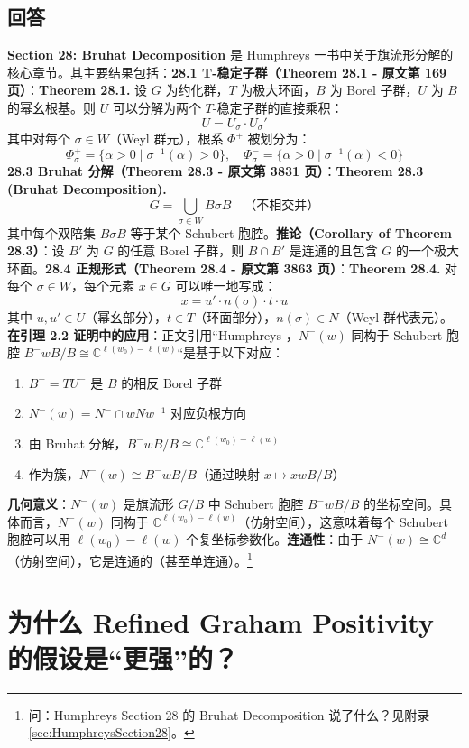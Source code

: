 \subsection{回答}
\textbf{Section 28: Bruhat Decomposition} 是 Humphreys 一书中关于旗流形分解的核心章节。其主要结果包括：\bigskip\textbf{28.1 T-稳定子群（Theorem 28.1 - 原文第 169 页）}：\textbf{Theorem 28.1.} 设 $G$ 为约化群，$T$ 为极大环面，$B$ 为 Borel 子群，$U$ 为 $B$ 的幂幺根基。则 $U$ 可以分解为两个 $T$-稳定子群的直接乘积：$$U = U_\sigma \cdot U_\sigma'$$其中对每个 $\sigma \in W$（Weyl 群元），根系 $\Phi^+$ 被划分为：$$\Phi_\sigma^+ = \{\alpha > 0 \mid \sigma^{-1}(\alpha) > 0\}, \quad \Phi_\sigma^- = \{\alpha > 0 \mid \sigma^{-1}(\alpha) < 0\}$$\bigskip\textbf{28.3 Bruhat 分解（Theorem 28.3 - 原文第 3831 页）}：\textbf{Theorem 28.3 (Bruhat Decomposition).}$$G = \bigcup_{\sigma \in W} B\sigma B \quad \text{（不相交并）}$$其中每个双陪集 $B\sigma B$ 等于某个 Schubert 胞腔。\textbf{推论（Corollary of Theorem 28.3）}：设 $B'$ 为 $G$ 的任意 Borel 子群，则 $B \cap B'$ 是连通的且包含 $G$ 的一个极大环面。\bigskip\textbf{28.4 正规形式（Theorem 28.4 - 原文第 3863 页）}：\textbf{Theorem 28.4.} 对每个 $\sigma \in W$，每个元素 $x \in G$ 可以唯一地写成：$$x = u' \cdot n(\sigma) \cdot t \cdot u$$其中 $u, u' \in U$（幂幺部分），$t \in T$（环面部分），$n(\sigma) \in N$（Weyl 群代表元）。\bigskip\textbf{在引理 2.2 证明中的应用}：正文引用``Humphreys \cite[Section 28]{humphreys1975}，$N^-(w)$ 同构于 Schubert 胞腔 $B^-wB/B \cong \mathbb{C}^{\ell(w_0) - \ell(w)}$``是基于以下对应：
\begin{enumerate}
\item $B^- = TU^-$ 是 $B$ 的相反 Borel 子群\item $N^-(w) = N^- \cap wNw^{-1}$ 对应负根方向\item 由 Bruhat 分解，$B^-wB/B \cong \mathbb{C}^{\ell(w_0) - \ell(w)}$\item 作为簇，$N^-(w) \cong B^-wB/B$（通过映射 $x \mapsto xwB/B$）
\end{enumerate}

\textbf{几何意义}：$N^-(w)$ 是旗流形 $G/B$ 中 Schubert 胞腔 $B^-wB/B$ 的坐标空间。具体而言，$N^-(w)$ 同构于 $\mathbb{C}^{\ell(w_0)-\ell(w)}$（仿射空间），这意味着每个 Schubert 胞腔可以用 $\ell(w_0)-\ell(w)$ 个复坐标参数化。\textbf{连通性}：由于 $N^-(w) \cong \mathbb{C}^d$（仿射空间），它是连通的（甚至单连通）。\footnote{问：Humphreys Section 28 的 Bruhat Decomposition 说了什么？见附录 \cref{sec:HumphreysSection28}。}
\section{为什么 Refined Graham Positivity 的假设是``更强''的？}\label{sec:WhyStrongerHypothesis}
